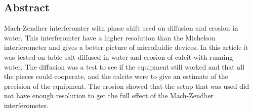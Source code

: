 \subsection {Abstract}
  Mach-Zendher interferomter with phase shift used on diffusion and erosion in
  water. This interferomter have a higher resolution than the Michelson interferometer
  and gives a better picture of microfluidic devices. In this article it was tested
  on table salt diffused in water and erosion of calcit with running water.
  The diffusion was a test to see if the equipment still worked and that all the
  pieces could cooperate, and the calcite were to give an estimate of the precision
  of the equipment. The erosion showed that the setup that was used did not have 
  enough resolution to get the full effect of the Mach-Zendher interferometer.
